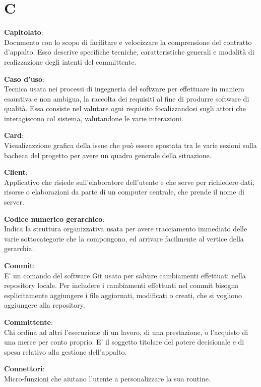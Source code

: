 \documentclass[a4paper, oneside, openany, dvipsnames, table]{article}
\begin{document}
\newpage
\section{C}
\textbf{Capitolato}:\\	Documento con lo scopo di facilitare e velocizzare la comprensione del contratto d'appalto. Esso descrive specifiche tecniche, caratteristiche generali e modalità di realizzazione degli intenti del committente.

\textbf{Caso d'uso}:\\	Tecnica usata nei processi di ingegneria del software per effettuare in maniera esaustiva e non ambigua, la raccolta dei requisiti al fine di produrre software di qualità. Essa consiste nel valutare ogni requisito focalizzandosi sugli attori che interagiscono col sistema, valutandone le varie interazioni.

\textbf{Card}:\\ Visualizazzione grafica della issue che può essere spostata tra le varie sezioni sulla bacheca del progetto per avere un quadro generale della situazione.

\textbf{Client}:\\	Applicativo che risiede sull'elaboratore dell'utente e che serve per richiedere dati, risorse o elaborazioni da parte di un computer centrale, che prende il nome di server.

\textbf{Codice numerico gerarchico}:\\  Indica la struttura organizzativa usata per avere tracciamento immediato delle varie sottocategorie che la compongono, ed  arrivare  facilmente al vertice della gerarchia.

\textbf{Commit}:\\ E' un comando del software Git usato per salvare cambiamenti effettuati nella repository locale. Per includere i cambiamenti effettuati nel commit bisogna esplicitamente aggiungere i file aggiornati, modificati o creati, che si vogliono aggiungere alla repository.


\textbf{Committente}:\\	Chi ordina ad altri l’esecuzione di un lavoro, di una prestazione, o l’acquisto di una merce per conto proprio. E' il soggetto titolare del potere decisionale e di spesa relativo alla gestione dell'appalto.

\textbf{Connettori}:\\ Micro-funzioni che aiutano l'utente a personalizzare la sua routine.
\end{document}
